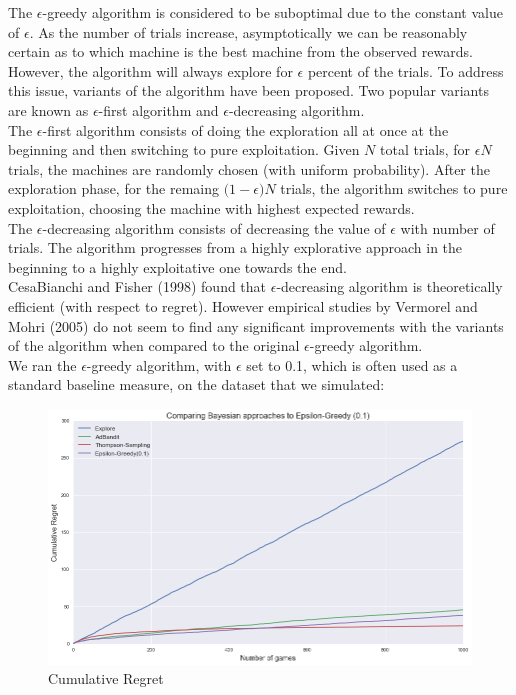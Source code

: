 \documentclass{article}
\begin{document}
The $\epsilon$-greedy algorithm is considered to be suboptimal due to the constant value of $\epsilon$. As the number of trials increase, asymptotically we can be reasonably certain as to which machine is the best machine from the observed rewards. However, the algorithm will always explore for $\epsilon$ percent of the trials. To address this issue, variants of the algorithm have been proposed. Two popular variants are known as $\epsilon$-first algorithm and $\epsilon$-decreasing algorithm.\\

The $\epsilon$-first algorithm consists of doing the exploration all at once at the beginning and then switching to pure exploitation. Given $N$ total trials, for $\epsilon N$ trials, the machines are randomly chosen (with uniform probability). After the exploration phase, for the remaing $\big( 1-\epsilon \big) N$ trials, the algorithm switches to pure exploitation, choosing the machine with highest expected rewards.\\

The $\epsilon$-decreasing algorithm consists of decreasing the value of $\epsilon$ with number of trials. The algorithm progresses from a highly explorative approach in the beginning to a highly exploitative one towards the end.\\

CesaBianchi and Fisher (1998) found that $\epsilon$-decreasing algorithm is theoretically efficient (with respect to regret). However empirical studies by Vermorel and Mohri (2005) do not seem to find any significant improvements with the variants of the algorithm when compared to the original $\epsilon$-greedy algorithm.\\

We ran the $\epsilon$-greedy algorithm, with $\epsilon$ set to 0.1, which is often used as a standard baseline measure, on the dataset that we simulated:

\begin{figure}[H]
\centering
\includegraphics[scale=0.4]{eps_greedy.png}
\caption{Cumulative Regret}
\end{figure}
\end{document}
